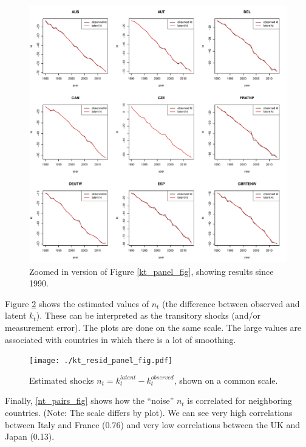 \documentclass[12pt]{article}
\begin{document}
\begin{figure}

  \includegraphics[width=1.05\textwidth]{./kt_recent_panel_fig.pdf}
  \caption{Zoomed in version of Figure \ref{kt_panel_fig}, showing
    results since 1990.}
    \label{kt_recent_panel_fig}
\end{figure}


Figure \ref{kt_resid_panel_fig} shows the estimated values of $n_t$
(the difference between observed and latent $k_t$). These can be
interpreted as the transitory shocks (and/or measurement error). The
plots are done on the same scale. The large values are associated with
countries in which there is a lot of smoothing.

\begin{figure}
  \label{kt_resid_panel_fig}
  \texttt{[image: ./kt\_resid\_panel\_fig.pdf]}
  \caption{Estimated shocks $n_t = k_t^{latent} - k_t^{observed}$,
    shown on a common scale.}
\end{figure}


Finally, \ref{nt_pairs_fig} shows how the ``noise'' $n_t$ is
correlated for neighboring countries. (Note: The scale differs by
plot). We can see very high correlations between Italy and France
(0.76) and very low correlations between the UK and Japan (0.13).
\end{document}
